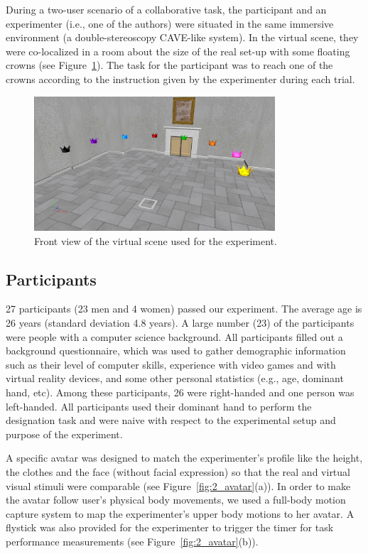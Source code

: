 During a two-user scenario of a collaborative task, the participant and an experimenter (i.e., one of the authors) were situated in the same immersive environment (a double-stereoscopy CAVE-like system). In the virtual scene, they were co-localized in a room about the size of the real set-up with some floating crowns (see Figure~\ref{fig:2_virtual_room}). The task for the participant was to reach one of the crowns according to the instruction given by the experimenter during each trial.

\begin{figure}[ht]
  \centering
  \includegraphics[width=0.8\textwidth]{figures/2_virtual_room}
  \caption{\label{fig:2_virtual_room}Front view of the virtual scene used for the experiment.}
\end{figure}

\subsection{Participants}
27 participants (23 men and 4 women) passed our experiment. The average age is 26 years (standard deviation 4.8 years).
A large number (23) of the participants were people with a computer science background. All participants filled out a background questionnaire, which was used to gather demographic information such as their level of computer skills, experience with video games and with virtual reality devices, and some other personal statistics (e.g., age, dominant hand, etc). Among these participants, 26 were right-handed and one person was left-handed. All participants used their dominant hand to perform the designation task and were naive with respect to the experimental setup and purpose of the experiment.

A specific avatar was designed to match the experimenter's profile like the height, the clothes and the face (without facial expression) so that the real and virtual visual stimuli were comparable (see Figure~\ref{fig:2_avatar}(a)). In order to make the avatar follow user's physical body movements, we used a full-body motion capture system to map the experimenter's upper body motions to her avatar. A flystick was also provided for the experimenter to trigger the timer for task performance measurements (see Figure~\ref{fig:2_avatar}(b)).

